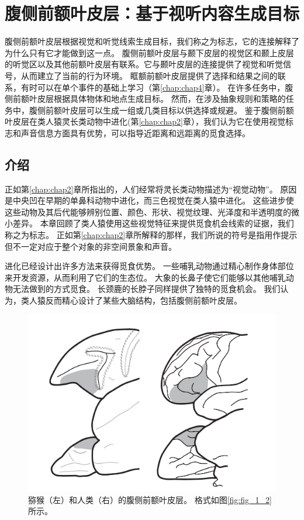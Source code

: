 \chapter{腹侧前额叶皮层：基于视听内容生成目标} \label{chap:chap7}
腹侧前额叶皮层根据视觉和听觉线索生成目标，我们称之为标志，它的连接解释了为什么只有它才能做到这一点。
腹侧前额叶皮层与颞下皮层的视觉区和颞上皮层的听觉区以及其他前额叶皮层有联系。它与颞叶皮层的连接提供了视觉和听觉信号，从而建立了当前的行为环境。
眶额前额叶皮层提供了选择和结果之间的联系，有时可以在单个事件的基础上学习（第\ref{chap:chap4}章）。
在许多任务中，腹侧前额叶皮层根据具体物体和地点生成目标。
然而，在涉及抽象规则和策略的任务中，腹侧前额叶皮层可以生成一组或几类目标以供选择或规避。
鉴于腹侧前额叶皮层在类人猿灵长类动物中进化(第\ref{chap:chap2}章），我们认为它在使用视觉标志和声音信息方面具有优势，可以指导近距离和远距离的觅食选择。

\section{介绍}
\par
正如第\ref{chap:chap2}章所指出的，人们经常将灵长类动物描述为“视觉动物”。
原因是中央凹在早期的单鼻科动物中进化，而三色视觉在类人猿中进化。 
这些进步使这些动物及其后代能够辨别位置、颜色、形状、视觉纹理、光泽度和半透明度的微小差异。
本章回顾了类人猿使用这些视觉特征来提供觅食机会线索的证据，我们称之为标志。
正如第\ref{chap:chap2}章所解释的那样，我们所说的符号是指用作提示但不一定对应于整个对象的非空间景象和声音。
\par
进化已经设计出许多方法来获得觅食优势。
一些哺乳动物通过精心制作身体部位来开发资源，从而利用了它们的生态位。
大象的长鼻子使它们能够以其他哺乳动物无法做到的方式觅食。
长颈鹿的长脖子同样提供了独特的觅食机会。
我们认为，类人猿反而精心设计了某些大脑结构，包括腹侧前额叶皮层。

\begin{figure} 
	\centering
	\includegraphics[width=0.7\linewidth]{image_pfc/Fig_7_1}
	\caption{猕猴（左）和人类（右）的腹侧前额叶皮层。
		格式如图\ref{fig:fig_1_2}所示。\label{fig:fig_7_1}}
\end{figure}
\par

